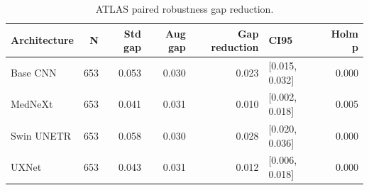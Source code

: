 \begin{table}
\caption{ATLAS paired robustness gap reduction.}
\label{tab:atlas_gap_reduction}
\begin{tabular}{lrrrrlr}
\toprule
Architecture & N & Std gap & Aug gap & Gap reduction & CI95 & Holm p \\
\midrule
Base CNN & 653 & 0.053 & 0.030 & 0.023 & [0.015, 0.032] & 0.000 \\
MedNeXt & 653 & 0.041 & 0.031 & 0.010 & [0.002, 0.018] & 0.005 \\
Swin UNETR & 653 & 0.058 & 0.030 & 0.028 & [0.020, 0.036] & 0.000 \\
UXNet & 653 & 0.043 & 0.031 & 0.012 & [0.006, 0.018] & 0.000 \\
\bottomrule
\end{tabular}
\end{table}
